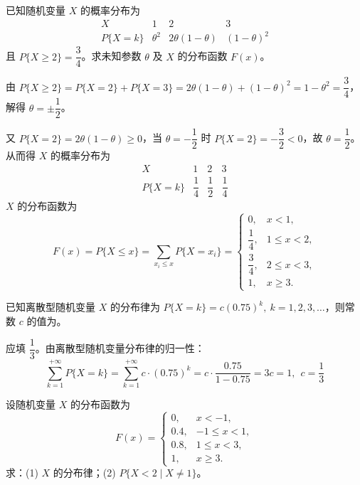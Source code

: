 \documentclass[lang=cn,11pt]{elegantbook}
\begin{document}
\begin{exercise}\label{exer:2-5}
已知随机变量 $X$ 的概率分布为
\[
\begin{array}{c|ccc}
X & 1 & 2 & 3 \\
\hline
P\{X=k\} & \theta^2 & 2\theta(1-\theta) & (1-\theta)^2
\end{array}
\]
且 $P\{X \ge 2\} = \dfrac{3}{4}$。求未知参数 $\theta$ 及 $X$ 的分布函数 $F(x)$。
\end{exercise}

\begin{solution}
由 $P\{X \ge 2\} = P\{X=2\} + P\{X=3\} = 2\theta(1-\theta) + (1-\theta)^2 = 1 - \theta^2 = \dfrac{3}{4}$，解得 $\theta = \pm\dfrac{1}{2}$。

又 $P\{X=2\} = 2\theta(1-\theta) \ge 0$，当 $\theta = -\dfrac{1}{2}$ 时 $P\{X=2\} = -\dfrac{3}{2} < 0$，故 $\theta = \dfrac{1}{2}$。从而得 $X$ 的概率分布为
\[
\begin{array}{c|ccc}
X & 1 & 2 & 3 \\
\hline
P\{X=k\} & \dfrac{1}{4} & \dfrac{1}{2} & \dfrac{1}{4}
\end{array}
\]
$X$ 的分布函数为
\[
F(x) = P\{X \le x\} = \sum_{x_i \le x} P\{X = x_i\} = \begin{cases}
0, & x < 1, \\
\dfrac{1}{4}, & 1 \le x < 2, \\
\dfrac{3}{4}, & 2 \le x < 3, \\
1, & x \ge 3.
\end{cases}
\]
\end{solution}

\begin{exercise}\label{exer:2-25}
已知离散型随机变量 $X$ 的分布律为 $P\{X=k\} = c(0.75)^k,\ k=1,2,3,\dots$，则常数 $c$ 的值为\underline{\hspace{2cm}}。
\end{exercise}

\begin{solution}
应填 $\dfrac{1}{3}$。由离散型随机变量分布律的归一性：
\[
\sum_{k=1}^{+\infty} P\{X=k\} = \sum_{k=1}^{+\infty} c\cdot(0.75)^k = c \cdot \frac{0.75}{1-0.75} = 3c = 1,~~c = \dfrac{1}{3}
\]
\end{solution}

\begin{exercise}\label{exer:2-26}
设随机变量 $X$ 的分布函数为
\[
F(x) = \begin{cases}
0, & x<-1, \\
0.4, & -1 \le x<1, \\
0.8, & 1 \le x<3, \\
1, & x \ge 3.
\end{cases}
\]
求：(1) $X$ 的分布律；(2) $P\{X<2 \mid X \neq 1\}$。
\end{exercise}
\end{document}

